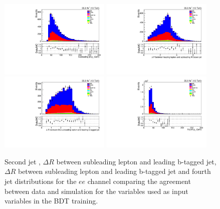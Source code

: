 \begin{figure}[htb]
\centering
\includegraphics[width=0.47\textwidth]{figs/background-estimation/plots/unblinded/prompt_ee_ttbarInc/secondJetPt_NPL_ee_wMass_ee.pdf}
\includegraphics[width=0.47\textwidth]{figs/background-estimation/plots/unblinded/prompt_ee_ttbarInc/zLep1Quark2DelR_NPL_ee_wMass_ee.pdf}
\\
\includegraphics[width=0.47\textwidth]{figs/background-estimation/plots/unblinded/prompt_ee_ttbarInc/zLep2BjetDelR_NPL_ee_wMass_ee.pdf}
\includegraphics[width=0.47\textwidth]{figs/background-estimation/plots/unblinded/prompt_ee_ttbarInc/fourthJetPt_NPL_ee_wMass_ee.pdf}
\caption{
Second jet \pt, $\Delta R$ between subleading lepton and leading b-tagged jet, $\Delta R$ between subleading lepton and leading b-tagged jet and fourth jet \pT distributions for the $ee$ channel comparing the agreement between data and simulation for the variables used as input variables in the BDT training.}
\label{fig:inputFeaturesDataSimAgreement4}
\end{figure}

